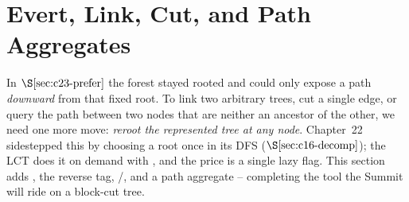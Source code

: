\section{Evert, Link, Cut, and Path Aggregates}\label{sec:c23-makeroot}

\begin{previouslybox}
In \(\secref{c23-prefer}\) the forest stayed rooted and  could only
expose a path \emph{downward} from that fixed root. To link two arbitrary trees,
cut a single edge, or query the path between two nodes that are neither an
ancestor of the other, we need one more move: \emph{reroot the represented tree at
any node}. Chapter~22 sidestepped this by choosing a root once in its DFS
(\(\secref{c16-decomp}\)); the LCT does it on demand with , and the
price is a single lazy flag. This section adds , the reverse tag,
/, and a path aggregate -- completing the tool the Summit
will ride on a block-cut tree.
\end{previouslybox}

